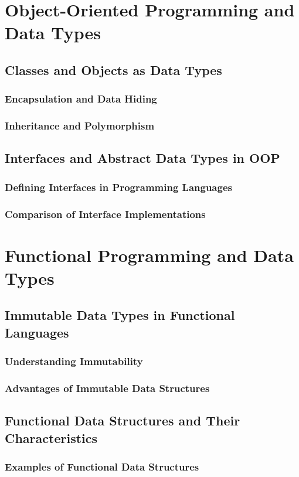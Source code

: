 \documentclass[12pt, oneside]{book}
\begin{document}
\section{Object-Oriented Programming and Data Types}
\subsection{Classes and Objects as Data Types}
\subsubsection{Encapsulation and Data Hiding}
\subsubsection{Inheritance and Polymorphism}
\subsection{Interfaces and Abstract Data Types in OOP}
\subsubsection{Defining Interfaces in Programming Languages}
\subsubsection{Comparison of Interface Implementations}
\section{Functional Programming and Data Types}
\subsection{Immutable Data Types in Functional Languages}
\subsubsection{Understanding Immutability}
\subsubsection{Advantages of Immutable Data Structures}
\subsection{Functional Data Structures and Their Characteristics}
\subsubsection{Examples of Functional Data Structures}
\end{document}
